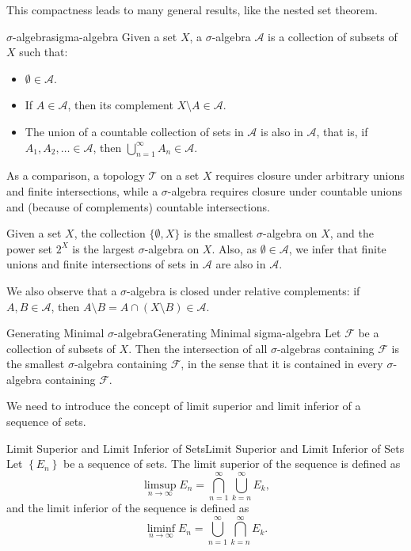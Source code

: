 \documentclass[../main.tex]{subfiles}
\begin{document}
This compactness leads to many general results, like the nested set theorem.

\begin{definition}{$\sigma$-algebra}{sigma-algebra}
	Given a set $X$, a $\sigma$-algebra $\mathcal{A}$ is a collection of subsets of $X$ such that:
	\begin{itemize}
		\item $\emptyset \in \mathcal{A}$.
		\item If $A \in \mathcal{A}$, then its complement $X \setminus A \in \mathcal{A}$.
		\item The union of a countable collection of sets in $\mathcal{A}$ is also in $\mathcal{A}$, that is, if $A_1, A_2, \ldots \in \mathcal{A}$, then $\bigcup_{n=1}^{\infty} A_n \in \mathcal{A}$.
	\end{itemize}
\end{definition}

\begin{remark}
	As a comparison, a topology $\mathcal{T}$ on a set $X$ requires closure under arbitrary unions and finite intersections, while a $\sigma$-algebra requires closure under countable unions and (because of complements) countable intersections.
\end{remark}

Given a set $X$, the collection $\{\emptyset , X\}$ is the smallest $\sigma$-algebra on $X$, and the power set $2^X$ is the largest $\sigma$-algebra on $X$. Also, as $\emptyset \in \mathcal{A}$, we infer that finite unions and finite intersections of sets in $\mathcal{A}$ are also in $\mathcal{A}$.

We also observe that a $\sigma$-algebra is closed under relative complements: if $A,B \in \mathcal{A}$, then $A \setminus B = A \cap (X \setminus B) \in \mathcal{A}$.

\begin{theorem}{Generating Minimal $\sigma$-algebra}{Generating Minimal sigma-algebra}
	Let $\mathcal{F}$ be a collection of subsets of $X$. Then the intersection of all $\sigma$-algebras containing $\mathcal{F}$ is the smallest $\sigma$-algebra containing $\mathcal{F}$, in the sense that it is contained in every $\sigma$-algebra containing $\mathcal{F}$.
\end{theorem}

We need to introduce the concept of limit superior and limit inferior of a sequence of sets.

\begin{definition}{Limit Superior and Limit Inferior of Sets}{Limit Superior and Limit Inferior of Sets}
	Let $\left\{ E_n \right\}$ be a sequence of sets. The limit superior of the sequence is defined as
	\begin{equation}
		\limsup_{n \to \infty} E_n = \bigcap_{n=1}^{\infty} \bigcup_{k=n}^{\infty} E_k,
	\end{equation}
	and the limit inferior of the sequence is defined as
	\begin{equation}
		\liminf_{n \to \infty} E_n = \bigcup_{n=1}^{\infty} \bigcap_{k=n}^{\infty} E_k.
	\end{equation}
\end{definition}
\end{document}
